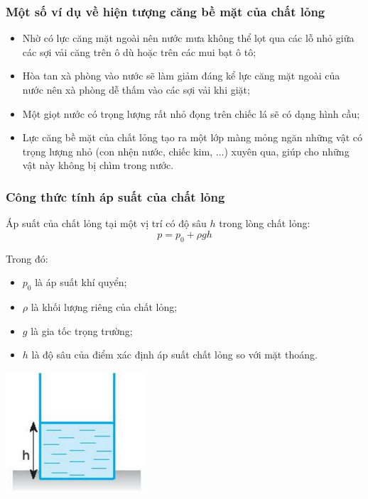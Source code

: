\subsubsection{Một số ví dụ về hiện tượng căng bề mặt của chất lỏng}
\begin{itemize}
	\item Nhờ có lực căng mặt ngoài nên nước mưa không thể lọt qua các lỗ nhỏ giữa các sợi vải căng trên ô dù hoặc trên các mui bạt ô tô;
	\item Hòa tan xà phòng vào nước sẽ làm giảm đáng kể lực căng mặt ngoài của nước nên xà phòng dễ thấm vào các sợi vải khi giặt;
	\item Một giọt nước có trọng lượng rất nhỏ đọng trên chiếc lá sẽ có dạng hình cầu;
	\item Lực căng bề mặt của chất lỏng tạo ra một lớp màng mỏng ngăn những vật có trọng lượng nhỏ (con nhện nước, chiếc kim, $\ldots$) xuyên qua, giúp cho những vật này không bị chìm trong nước.
\end{itemize}

\subsubsection{Công thức tính áp suất của chất lỏng}
\begin{minipage}[l]{0.75\linewidth}
	Áp suất của chất lỏng tại một vị trí có độ sâu $h$ trong lòng chất lỏng:
	$$p = p_0 + \rho g h$$
	
	Trong đó:
	\begin{itemize}
		\item $p_0$ là áp suất khí quyển;
		\item $\rho$ là khối lượng riêng của chất lỏng;
		\item $g$ là gia tốc trọng trường;
		\item $h$ là độ sâu của điểm xác định áp suất chất lỏng so với mặt thoáng.
	\end{itemize}
\end{minipage}
\begin{minipage}[r]{0.15\linewidth}
	\begin{center}
		\includegraphics[scale=1]{../figs/G10-029-2}
	\end{center}
\end{minipage}
